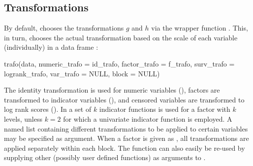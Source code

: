 \documentclass[article]{jss}
\begin{document}
\subsection{Transformations}

By default,  chooses the transformations $g$ and $h$
via the wrapper function . This, in turn, chooses the actual
transformation based on the scale of each variable (individually) in a data frame
:
\begin{Sinput}
trafo(data, numeric_trafo = id_trafo, factor_trafo = f_trafo,
  surv_trafo = logrank_trafo, var_trafo = NULL, block = NULL)
\end{Sinput}
The identity transformation is used for numeric variables (),
factors are transformed to indicator variables (),
and censored variables are transformed to log rank scores ().
In  a set of $k$ indicator functions is used for a factor
with $k$ levels, unless $k = 2$ for which a univariate indicator function
is employed. A named list containing different transformations to be applied
to certain variables may be specified as  argument. 
When a factor is given as , all transformations are applied separately 
within each block.
The function  can also easily be re-used by supplying
other (possibly user defined functions) as arguments to 
.
\end{document}
